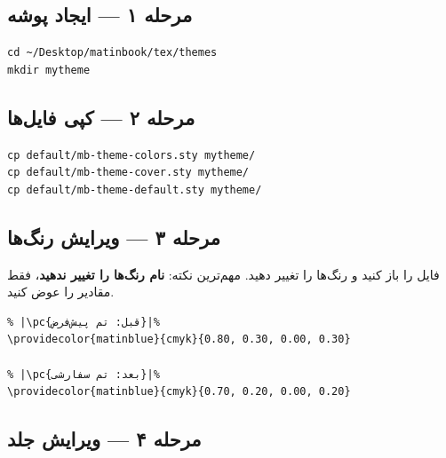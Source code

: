 \subsection{مرحله ۱ — ایجاد پوشه}
\label{sec:custom-theme-step1}

\begin{latin}
\begin{verbatim}
cd ~/Desktop/matinbook/tex/themes
mkdir mytheme
\end{verbatim}
\end{latin}


\subsection{مرحله ۲ — کپی فایل‌ها}
\label{sec:custom-theme-step2}

\begin{latin}
\begin{verbatim}
cp default/mb-theme-colors.sty mytheme/
cp default/mb-theme-cover.sty mytheme/
cp default/mb-theme-default.sty mytheme/
\end{verbatim}
\end{latin}


\subsection{مرحله ۳ — ویرایش رنگ‌ها}
\label{sec:custom-theme-step3}

فایل  را باز کنید
و رنگ‌ها را تغییر دهید. مهم‌ترین نکته:
\textbf{نام رنگ‌ها را تغییر ندهید}، فقط
مقادیر  را عوض کنید.

\begin{latin}
\begin{verbatim}
% |\pc{قبل: تم پیش‌فرض}|%
\providecolor{matinblue}{cmyk}{0.80, 0.30, 0.00, 0.30}

% |\pc{بعد: تم سفارشی}|%
\providecolor{matinblue}{cmyk}{0.70, 0.20, 0.00, 0.20}
\end{verbatim}
\end{latin}


\subsection{مرحله ۴ — ویرایش جلد}
\label{sec:custom-theme-step4}

